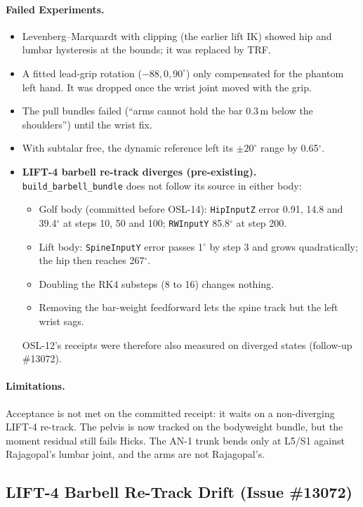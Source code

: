 \documentclass[11pt,a4paper]{article}
\begin{document}
\paragraph{Failed Experiments.}
\begin{itemize}[nosep]
\item Levenberg--Marquardt with clipping (the earlier lift IK) showed hip and
  lumbar hysteresis at the bounds; it was replaced by TRF.
\item A fitted lead-grip rotation ($-88, 0, 90^\circ$) only compensated for the
  phantom left hand. It was dropped once the wrist joint moved with the grip.
\item The pull bundles failed (``arms cannot hold the bar 0.3\,m below the
  shoulders'') until the wrist fix.
\item With subtalar free, the dynamic reference left its $\pm20^\circ$ range by
  0.65$^\circ$.
\item \textbf{LIFT-4 barbell re-track diverges (pre-existing).}
  \texttt{build\_barbell\_bundle} does not follow its source in either body:
  \begin{itemize}[nosep]
  \item Golf body (committed before OSL-14): \texttt{HipInputZ} error 0.91,
    14.8 and 39.4$^\circ$ at steps 10, 50 and 100; \texttt{RWInputY}
    85.8$^\circ$ at step 200.
  \item Lift body: \texttt{SpineInputY} error passes 1$^\circ$ by step 3 and
    grows quadratically; the hip then reaches 267$^\circ$.
  \item Doubling the RK4 substeps (8 to 16) changes nothing.
  \item Removing the bar-weight feedforward lets the spine track but the left
    wrist sags.
  \end{itemize}
  OSL-12's receipts were therefore also measured on diverged states
  (follow-up \#13072).
\end{itemize}

\paragraph{Limitations.} Acceptance is not met on the committed receipt: it
waits on a non-diverging LIFT-4 re-track. The pelvis is now tracked on the
bodyweight bundle, but the moment residual still fails Hicks. The AN-1 trunk
bends only at L5/S1 against Rajagopal's lumbar joint, and the arms are not
Rajagopal's.

\subsection{LIFT-4 Barbell Re-Track Drift (Issue \#13072)}
\end{document}
